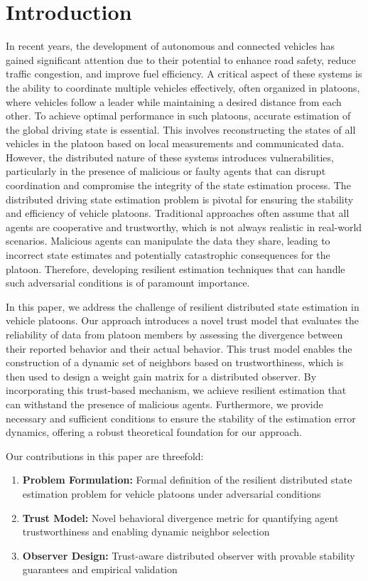 \documentclass[letterpaper, 10pt, conference]{ieeeconf}  %
\begin{document}
\section{Introduction}\label{sec_introduction}

In recent years, the development of autonomous and connected vehicles has gained significant attention due to their potential to enhance road safety, reduce traffic congestion, and improve fuel efficiency. A critical aspect of these systems is the ability to coordinate multiple vehicles effectively, often organized in platoons, where vehicles follow a leader while maintaining a desired distance from each other. To achieve optimal performance in such platoons, accurate estimation of the global driving state is essential. This involves reconstructing the states of all vehicles in the platoon based on local measurements and communicated data. However, the distributed nature of these systems introduces vulnerabilities, particularly in the presence of malicious or faulty agents that can disrupt coordination and compromise the integrity of the state estimation process.
The distributed driving state estimation problem is pivotal for ensuring the stability and efficiency of vehicle platoons. Traditional approaches often assume that all agents are cooperative and trustworthy, which is not always realistic in real-world scenarios. Malicious agents can manipulate the data they share, leading to incorrect state estimates and potentially catastrophic consequences for the platoon. Therefore, developing resilient estimation techniques that can handle such adversarial conditions is of paramount importance.

In this paper, we address the challenge of resilient distributed state estimation in vehicle platoons. Our approach introduces a novel trust model that evaluates the reliability of data from platoon members by assessing the divergence between their reported behavior and their actual behavior. This trust model enables the construction of a dynamic set of neighbors based on trustworthiness, which is then used to design a weight gain matrix for a distributed observer. By incorporating this trust-based mechanism, we achieve resilient estimation that can withstand the presence of malicious agents. Furthermore, we provide necessary and sufficient conditions to ensure the stability of the estimation error dynamics, offering a robust theoretical foundation for our approach.

Our contributions in this paper are threefold:
\begin{enumerate}
    \item \textbf{Problem Formulation:} Formal definition of the resilient distributed state estimation problem for vehicle platoons under adversarial conditions
    
    \item \textbf{Trust Model:} Novel behavioral divergence metric for quantifying agent trustworthiness and enabling dynamic neighbor selection
    
    \item \textbf{Observer Design:} Trust-aware distributed observer with provable stability guarantees and empirical validation
\end{enumerate}
\end{document}
